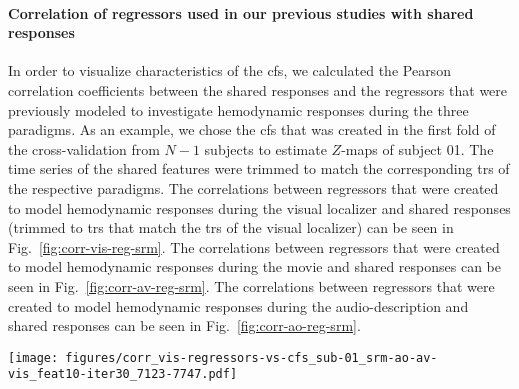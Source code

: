 \paragraph{Correlation of regressors used in our previous studies with shared
responses}





In order to visualize characteristics of the \ac{cfs}, we calculated the Pearson
correlation coefficients between the shared responses and the regressors that
were previously modeled \citep[cf.][]{sengupta2016extension,
haeusler2022processing} to investigate hemodynamic responses during the three
paradigms.
%
As an example, we chose the \ac{cfs} that was created in the first fold of the
cross-validation from $N-1$ subjects to estimate $Z$-maps of subject 01.
%
The time series of the shared features were trimmed to match the corresponding
\acp{tr} of the respective paradigms.
%
The correlations between regressors that were created to model hemodynamic
responses during the visual localizer and shared responses (trimmed to \acp{tr}
that match the \acp{tr} of the visual localizer) can be seen in
Fig.~\ref{fig:corr-vis-reg-srm}.
%
The correlations between regressors that were created to model hemodynamic
responses during the movie \citep[cf. Table 3 in][]{haeusler2022processing} and
shared responses can be seen in Fig.~\ref{fig:corr-av-reg-srm}.
%
The correlations between regressors that were created to model hemodynamic
responses during the audio-description \citep[cf. Table 3
in][]{haeusler2022processing} and shared responses can be seen in
Fig.~\ref{fig:corr-ao-reg-srm}.



\begin{figure*}[tbp]
\centering
\texttt{[image: figures/corr\_vis-regressors-vs-cfs\_sub-01\_srm-ao-av-vis\_feat10-iter30\_7123-7747.pdf]}
\caption{
%
\textbf{Pearson correlation coefficients between regressors of the visual
localizer and shared features.}
%
The time series of the shared features within the multi-paradigm \ac{cfs}
%
(as calculated for subject 01 in the first fold of the cross-validation)
%
were trimmed to match the corresponding \acp{tr} of the visual localizer
paradigm \citep{sengupta2016extension}.
%
The six regressors of the visual localizer model hemodynamic responses to
the six categories of pictures that were presented in blocks.
}
\label{fig:corr-vis-reg-srm}
\end{figure*}


